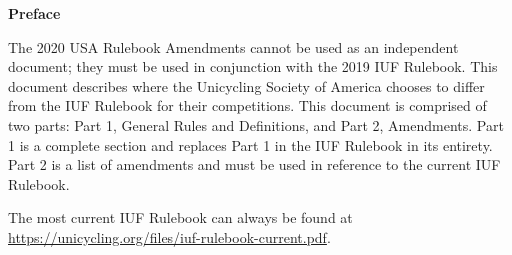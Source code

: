 {\huge \textbf{Preface} \\}
\thispagestyle{plain}


The 2020 USA Rulebook Amendments cannot be used as an independent document; they must be used in conjunction with the 2019 IUF Rulebook.
This document describes where the Unicycling Society of America chooses to differ from the IUF Rulebook for their competitions.
This document is comprised of two parts: Part 1, General Rules and Definitions, and Part 2, Amendments.
Part 1 is a complete section and replaces Part 1 in the IUF Rulebook in its entirety.
Part 2 is a list of amendments and must be used in reference to the current IUF Rulebook.

The most current IUF Rulebook can always be found at \url{https://unicycling.org/files/iuf-rulebook-current.pdf}.
